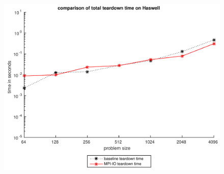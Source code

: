 \documentclass[9pt,pdftex,xcolor=dvipsnames]{beamer}
\begin{document}
\begin{frame}{\insertsubsection}
{\begin{minipage}{0.45\textwidth}
\begin{figure}
\end{figure}
\end{minipage}
\hspace{0.2cm}
\begin{minipage}{0.45\textwidth}
\begin{figure}
\centering
\includegraphics[scale=0.3]{img/comparison_hw_io_td.pdf}
\end{figure}
\end{minipage}
}
\end{frame}
\end{document}
